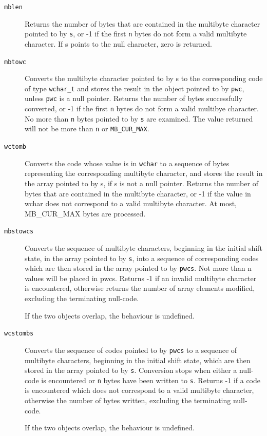    \begin{description}
    \item[\texttt{mblen}] Returns the number of bytes that  are  contained  in  the multibyte
     character pointed to by \texttt{s}, or -1 if the first
     \texttt{n} bytes do not form a  valid  multibyte  character.   If
     s points to the null character, zero is returned.

    \item[\texttt{mbtowc}] Converts the multibyte character pointed to by s  to  the corresponding
     code of type \texttt{wchar\_t} and stores the result in the object
     pointed to by \texttt{pwc}, unless  \texttt{pwc}  is  a  null
     pointer.    Returns  the  number  of  bytes  successfully converted, or
     -1 if the first \texttt{n} bytes do not form a valid
     multibye character.  No more than \texttt{n} bytes pointed to by
     \texttt{s} are examined.  The value returned will not be more than
     \texttt{n} or \texttt{MB\_CUR\_MAX}.

    \item[\texttt{wctomb}] Converts the code whose value is in
     \texttt{wchar} to  a  sequence of   bytes   representing   the
     corresponding  multibyte character, and stores the result in the array
     pointed  to by  s, if s is not a null pointer.  Returns the number of
     bytes that are contained in the multibyte character, or -1 if the
     value in wchar does not correspond to a valid multibyte  character.  At
     most, MB\_CUR\_MAX  bytes  are processed.

    \item[\texttt{mbstowcs}] 
     Converts the sequence of multibyte characters,  beginning in the
      initial shift state, in the array pointed to by \texttt{s}, into
      a sequence of corresponding  codes  which  are  then stored  in  the
      array pointed to by \texttt{pwcs}. Not more than n values will be
      placed in pwcs.  Returns -1 if an  invalid multibyte
      character is encountered, otherwise returns the number  of  array
      elements   modified,   excluding   the terminating null-code.


     If the two objects overlap, the behaviour is undefined.

    

    \item[\texttt{wcstombs}] 
     Converts the sequence of codes pointed to by  \texttt{pwcs}  to
      a sequence   of  multibyte  characters,  beginning  in  the initial shift
      state, which are then stored in  the  array pointed to by \texttt{s}.
      Conversion stops when either a null-code is encountered  or
      \texttt{n}  bytes  have  been  written  to  \texttt{s}.  Returns
      -1  if  a  code  is  encountered  which does not correspond
      to a valid multibyte character, otherwise  the number  of bytes written,
      excluding the terminating null-code.


     If the two objects overlap, the behaviour is undefined.

    
   \end{description}

